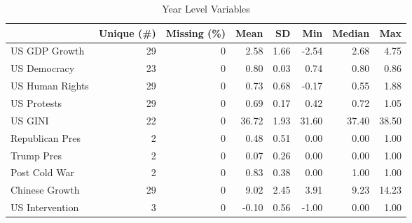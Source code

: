 \begin{table}

\caption{\label{tab:}Year Level Variables}
\centering
\begin{tabular}[t]{lrrrrrrr}
\toprule
  & Unique (\#) & Missing (\%) & Mean & SD & Min & Median & Max\\
\midrule
US GDP Growth & 29 & 0 & 2.58 & 1.66 & -2.54 & 2.68 & 4.75\\
US Democracy & 23 & 0 & 0.80 & 0.03 & 0.74 & 0.80 & 0.86\\
US Human Rights & 29 & 0 & 0.73 & 0.68 & -0.17 & 0.55 & 1.88\\
US Protests & 29 & 0 & 0.69 & 0.17 & 0.42 & 0.72 & 1.05\\
US GINI & 22 & 0 & 36.72 & 1.93 & 31.60 & 37.40 & 38.50\\
Republican Pres & 2 & 0 & 0.48 & 0.51 & 0.00 & 0.00 & 1.00\\
Trump Pres & 2 & 0 & 0.07 & 0.26 & 0.00 & 0.00 & 1.00\\
Post Cold War & 2 & 0 & 0.83 & 0.38 & 0.00 & 1.00 & 1.00\\
Chinese Growth & 29 & 0 & 9.02 & 2.45 & 3.91 & 9.23 & 14.23\\
US Intervention & 3 & 0 & -0.10 & 0.56 & -1.00 & 0.00 & 1.00\\
\bottomrule
\end{tabular}
\end{table}
